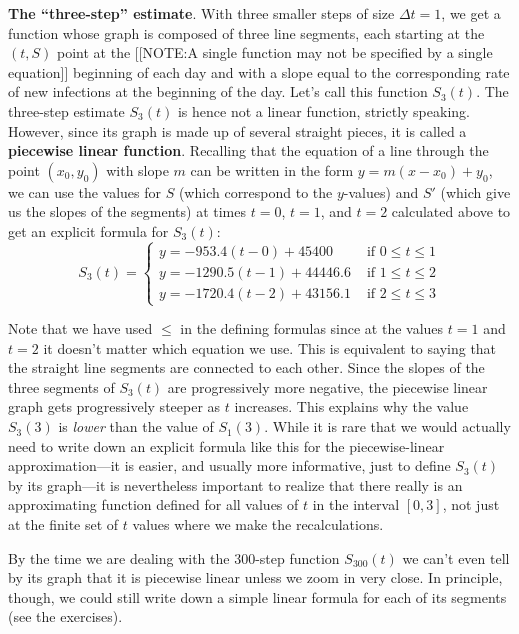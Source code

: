 \textbf{The ``three-step'' estimate}.  With three smaller steps of
 size $\Delta t = 1$, we get a function whose graph is composed of
 three line segments, each starting at the $(t, S)$ point at the
[[NOTE:A single function  may not be specified  by a single equation]]
beginning of each day and with a slope equal to the corresponding rate
 of new infections at the beginning of the day.  Let's call this
 function $S_{3}(t)$. The three-step estimate $S_{3}(t)$ is hence not
 a linear function, strictly speaking.  However, since its graph is
 made up of several straight pieces, it is called a {\bf piecewise
 linear function}. Recalling that the
 equation of a line through the point $(x_0, y_0)$ with slope $m$ can
 be written in the form $y=m(x-x_0)+y_0$, we can use the values for
 $S$ (which correspond to the $y$-values) and $S'$ (which give us the
 slopes of the segments) at times $t=0$, $t=1$, and $t=2$ calculated
 above to get an explicit formula for $S_{3}(t)$:
\[
S_3(t)=\left\{\begin{array}{ll}
			y = -953.4(t-0)+45400 & \mbox{ if $0\leq t\leq 1$} \\
			y=-1290.5(t-1)+44446.6&\mbox{ if $1\leq t\leq 2$} \\
			y=-1720.4(t-2)+43156.1&\mbox{ if $2\leq t\leq 3$}
		\end{array}
	\right.
\]

Note that we have used $\leq$ in the defining formulas since at the
 values $t=1$ and $t=2$ it doesn't matter which equation we use.  This
 is equivalent to saying that the straight line segments are connected
 to each other.  Since the slopes of the three segments of $S_{3}(t)$
 are progressively more negative, the piecewise linear graph gets
 progressively steeper as $t$ increases.  This explains why the value
 $S_{3}(3)$ is {\em lower\/} than the value of $S_{1}(3)$.  While it
 is rare that we would actually need to write down an explicit formula
 like this for the piecewise-linear approximation---it is easier, and
 usually more informative, just to define $S_{3}(t)$ by its graph---it
 is nevertheless important to realize that there really is an
 approximating function defined for all values of $t$ in the interval
 $[0, 3]$, not just at the finite set of $t$ values where we make the
 recalculations.

By the time we are dealing with the 300-step function $S_{300}(t)$ we
 can't even tell by its graph that it is piecewise linear unless we
 zoom in very close.  In principle, though, we could still write down
 a simple linear formula for each of its segments (see the exercises).




